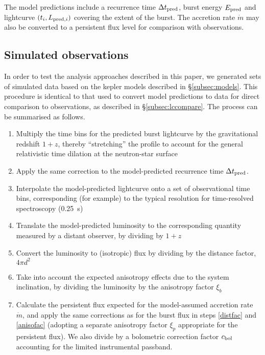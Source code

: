 \documentclass{aastex61}
\begin{document}
The model predictions include a recurrence time $\Delta t_{\rm pred}$, burst energy $E_{\rm pred}$ and lightcurve $(t_i,L_{{\rm pred},i})$ covering the extent of the burst.
%
The accretion rate $\dot{m}$ may also be converted to a persistent flux level for comparison with observations.

\subsection{Simulated observations}
\label{subsec:simobs}

In order to test the analysis approaches described in this paper, we generated sets of simulated data based on the {\sc kepler} models described in \S\ref{subsec:models}. 
%
This procedure is identical to that used to convert model predictions to data for direct comparison to observations, as described in \S\ref{subsec:lccompare}.
%
The process can be summarised as follows.
\begin{enumerate}
\item Multiply the time bins for the predicted burst lightcurve by the gravitational redshift $1+z$, thereby ``stretching'' the profile to account for the general relativistic time dilation at the neutron-star surface
\item Apply the same correction to the model-predicted recurrence time $\Delta t_{\rm pred}$.
\item Interpolate the model-predicted lightcurve onto a set of observational time bins, corresponding (for example) to the typical resolution for time-resolved spectroscopy (0.25~s)
\item Translate the model-predicted luminosity to the corresponding quantity measured by a distant observer, by 
dividing by $1+z$
\item Convert the luminosity to (isotropic) flux by dividing by the distance factor, $4\pi d^2$ \label{distfac}
\item Take into account the expected anisotropy effects due to the system inclination, by dividing the luminosity by the anisotropy factor $\xi_b$ \label{anisofac}
\item Calculate the persistent flux expected for the model-assumed accretion rate $\dot{m}$, and apply the same corrections as for the burst flux in steps \ref{distfac} and \ref{anisofac} (adopting a separate anisotropy factor $\xi_p$ appropriate for the persistent flux). We also divide by a bolometric correction factor $c_{\rm bol}$ accounting for the limited instrumental passband.
\end{enumerate}
\end{document}
